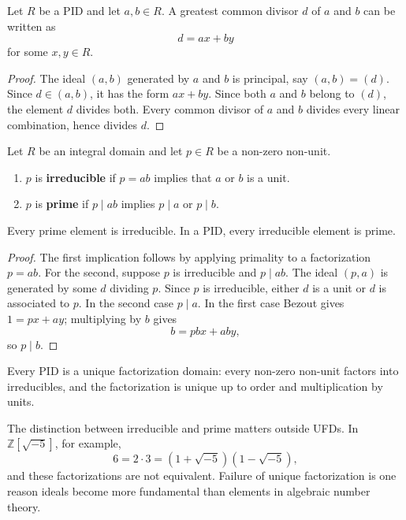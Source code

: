 \begin{theorem}
Let $R$ be a PID and let $a,b\in R$. A greatest common divisor $d$ of $a$ and $b$ can be written as
\[
    d=ax+by
\]
for some $x,y\in R$.
\end{theorem}

\begin{proof}
The ideal $(a,b)$ generated by $a$ and $b$ is principal, say $(a,b)=(d)$. Since $d\in(a,b)$, it has the form $ax+by$. Since both $a$ and $b$ belong to $(d)$, the element $d$ divides both. Every common divisor of $a$ and $b$ divides every linear combination, hence divides $d$.
\end{proof}

\begin{definition}
Let $R$ be an integral domain and let $p\in R$ be a non-zero non-unit.
\begin{enumerate}
    \item $p$ is \textbf{irreducible} if $p=ab$ implies that $a$ or $b$ is a unit.
    \item $p$ is \textbf{prime} if $p\mid ab$ implies $p\mid a$ or $p\mid b$.
\end{enumerate}
\end{definition}

\begin{proposition}
Every prime element is irreducible. In a PID, every irreducible element is prime.
\end{proposition}

\begin{proof}
The first implication follows by applying primality to a factorization $p=ab$. For the second, suppose $p$ is irreducible and $p\mid ab$. The ideal $(p,a)$ is generated by some $d$ dividing $p$. Since $p$ is irreducible, either $d$ is a unit or $d$ is associated to $p$. In the second case $p\mid a$. In the first case Bezout gives $1=px+ay$; multiplying by $b$ gives
\[
    b=pbx+aby,
\]
so $p\mid b$.
\end{proof}

\begin{theorem}
Every PID is a unique factorization domain: every non-zero non-unit factors into irreducibles, and the factorization is unique up to order and multiplication by units.
\end{theorem}

\begin{remark}
The distinction between irreducible and prime matters outside UFDs. In $\mathbb{Z}[\sqrt{-5}]$, for example,
\[
    6=2\cdot3=(1+\sqrt{-5})(1-\sqrt{-5}),
\]
and these factorizations are not equivalent. Failure of unique factorization is one reason ideals become more fundamental than elements in algebraic number theory.
\end{remark}

